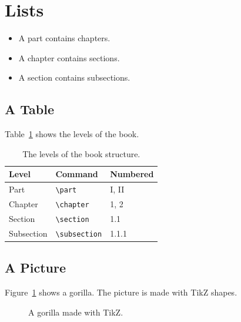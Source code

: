 \documentclass[a4paper,11pt,openright]{memoir}
\begin{document}
\section{Lists}
\begin{itemize}
  \item A part contains chapters.
  \item A chapter contains sections.
  \item A section contains subsections.
\end{itemize}

\subsection{A Table}
Table~\ref{tab:levels} shows the levels of the book.

\begin{table}[ht]
  \centering
  \begin{tabular}{lll}
    \toprule
    Level & Command & Numbered \\
    \midrule
    Part       & \verb|\part|       & I, II \\
    Chapter    & \verb|\chapter|    & 1, 2 \\
    Section    & \verb|\section|    & 1.1 \\
    Subsection & \verb|\subsection| & 1.1.1 \\
    \bottomrule
  \end{tabular}
  \caption{The levels of the book structure.}
  \label{tab:levels}
\end{table}

\subsection{A Picture}
Figure~\ref{fig:gorilla} shows a gorilla. The picture is made with TikZ shapes.

\begin{figure}[ht]
  \centering
  \newcommand{\gorillascale}{0.8}
  
  \caption{A gorilla made with TikZ.}
  \label{fig:gorilla}
\end{figure}
\end{document}
